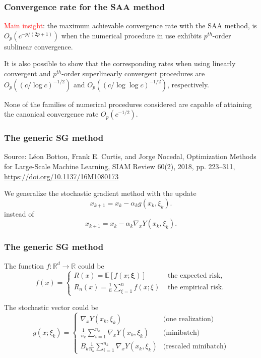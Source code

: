\documentclass{beamer}
\def\bxi{\boldsymbol\xi}
\def\EE{\mathbb{E}}
\def\RR{\mathbb{R}}
\begin{document}
\begin{frame}
\frametitle{Convergence rate for the SAA method}

\textcolor{red}{Main insight}: the maximum achievable convergence rate with the SAA method, is $O_p ( c^{- p /( 2p + 1 )})$ when the numerical
procedure in use exhibits $p^{th}$-order sublinear convergence.

\mbox{}

It is also possible to show that the corresponding rates when using linearly convergent and $p^{th}$-order superlinearly convergent procedures are $O_p (( c / \log c )^{-1/2} )$ and $O_p (( c / \log\log c )^{-1/2} )$, respectively.

\mbox{}

None of the families of numerical procedures considered are capable
of attaining the canonical convergence rate $O_p ( c^{-1/2} )$.

\end{frame}

\begin{frame}
\frametitle{The generic SG method}

Source: Léon Bottou, Frank E. Curtis, and Jorge Nocedal, Optimization Methods for Large-Scale Machine Learning, SIAM Review 60(2), 2018, pp. 223--311, \url{https://doi.org/10.1137/16M1080173}

\mbox{}

We generalize the stochastic gradient method with the update
$$
x_{k+1} = x_k - \alpha_k g(x_k, \xi_k).
$$
instead of
$$
x_{k+1} = x_k - \alpha_k \nabla_x Y(x_k, \xi_k).
$$

\end{frame}

\begin{frame}
\frametitle{The generic SG method}

The function $f: \RR^d \rightarrow \RR$ could be
$$
f(x) =
\begin{cases}
R(x) = \EE [ f(x; \bxi) ] & \text{ the expected risk,} \\
R_n(x) = \frac{1}{n} \sum_{\xi = 1}^n f(x; \xi) & \text{ the empirical risk.}
\end{cases}
$$

\mbox{}

The stochastic vector could be
$$
g(x; \xi_k) =
\begin{cases}
\nabla_x Y(x_k, \xi_k) & \text{(one realization)} \\
\frac{1}{n_k} \sum_{i = 1}^{n_k} \nabla_x Y(x_k, \xi_k) & \text{(minibatch)} \\
B_k \frac{1}{n_k} \sum_{i = 1}^{n_k} \nabla_x Y(x_k, \xi_k)
& \text{(rescaled minibatch)}
\end{cases}
$$

\end{frame}
\end{document}
